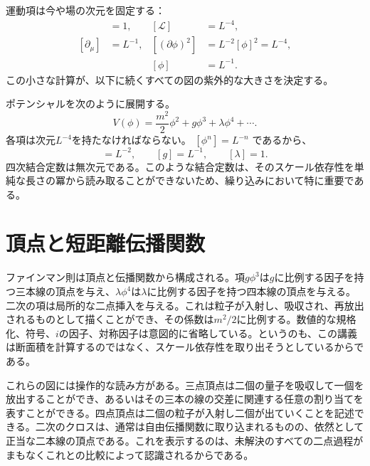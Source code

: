 運動項は今や場の次元を固定する：
\begin{align}
[S]&=1, & [\mathcal L]&=L^{-4},\\
[\partial_\mu]&=L^{-1}, &
[(\partial\phi)^2]&=L^{-2}[\phi]^2=L^{-4},\nonumber\\
&& [\phi]&=L^{-1}.
\label{eq:scalar-dimension}
\end{align}
この小さな計算が、以下に続くすべての図の紫外的な大きさを決定する。

ポテンシャルを次のように展開する。
\begin{equation}
V(\phi)=\frac{m^2}{2}\phi^2+g\phi^3+\lambda\phi^4+\cdots.
\label{eq:scalar-potential}
\end{equation}
各項は次元\(L^{-4}\)を持たなければならない。
\([\phi^n]=L^{-n}\)
であるから、
\begin{equation}
[m^2]=L^{-2},
\qquad
[g]=L^{-1},
\qquad
[\lambda]=1.
\label{eq:coupling-dimensions}
\end{equation}
四次結合定数は無次元である。このような結合定数は、そのスケール依存性を単純な長さの冪から読み取ることができないため、繰り込みにおいて特に重要である。

\begin{classroomqa}
\end{classroomqa}

\section{頂点と短距離伝播関数}

ファインマン則は頂点と伝播関数から構成される。項\(g\phi^3\)は\(g\)に比例する因子を持つ三本線の頂点を与え、\(\lambda\phi^4\)は\(\lambda\)に比例する因子を持つ四本線の頂点を与える。二次の項は局所的な二点挿入を与える。これは粒子が入射し、吸収され、再放出されるものとして描くことができ、その係数は\(m^2/2\)に比例する。数値的な規格化、符号、\(i\)の因子、対称因子は意図的に省略している。というのも、この講義は断面積を計算するのではなく、スケール依存性を取り出そうとしているからである。

これらの図には操作的な読み方がある。三点頂点は二個の量子を吸収して一個を放出することができ、あるいはその三本の線の交差に関連する任意の割り当てを表すことができる。四点頂点は二個の粒子が入射し二個が出ていくことを記述できる。二次のクロスは、通常は自由伝播関数に取り込まれるものの、依然として正当な二本線の頂点である。これを表示するのは、未解決のすべての二点過程がまもなくこれとの比較によって認識されるからである。


